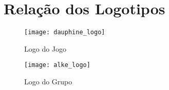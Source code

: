 \AddToShipoutPicture{\BackgroundPic}

\section*{Relação dos Logotipos}

	\begin{figure}[htb]
		\center
		\texttt{[image: dauphine\_logo]}
		\caption{Logo do Jogo}
	\end{figure}
	
	\begin{figure}[htb]
		\center
		\texttt{[image: alke\_logo]}
		\caption{Logo do Grupo}
	\end{figure}
